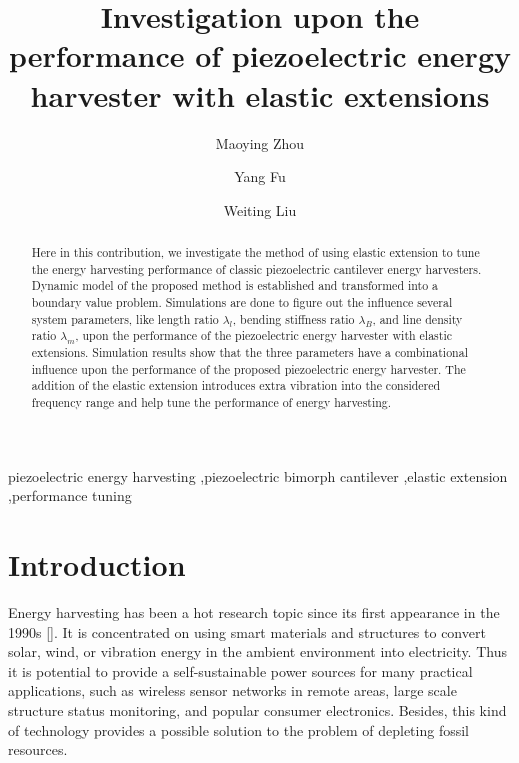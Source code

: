 \documentclass{elsarticle}
\begin{document}
\title{Investigation upon the performance of piezoelectric energy harvester with elastic extensions}
\author[1]{Maoying Zhou}
\author[2,3]{Yang Fu}
\author[3]{Weiting Liu}


\address[1]{School of Mechanical Engineering, Hangzhou Dianzi University, Hangzhou, China}
\address[2]{School of Automation and Mechanical Systems, Zhejiang University of Science and Technology, Hangzhou, China}
\address[3]{State Key Lab of Fluid Power and Mechanical Systems, Zhejiang University, Hangzhou, China}


\begin{abstract}

Here in this contribution, we investigate the method of using elastic extension to tune the energy harvesting performance of classic piezoelectric cantilever energy harvesters. Dynamic model of the proposed method is established and transformed into a boundary value problem. Simulations are done to figure out the influence several system parameters, like length ratio $\lambda_l$, bending stiffness ratio $\lambda_B$, and line density ratio $\lambda_m$, upon the performance of the piezoelectric energy harvester with elastic extensions. Simulation results show that the three parameters have a combinational influence upon the performance of the proposed piezoelectric energy harvester. The addition of the elastic extension introduces extra vibration into the considered frequency range and help tune the performance of energy harvesting. 

\end{abstract}

\begin{keyword}
piezoelectric energy harvesting \sep piezoelectric bimorph cantilever \sep elastic extension \sep performance tuning
\end{keyword}

\maketitle


\section{Introduction}

Energy harvesting has been a hot research topic since its first appearance in the 1990s []. It is concentrated on using smart materials and structures to convert solar, wind, or vibration energy in the ambient environment into electricity. Thus it is potential to provide a self-sustainable power sources for many practical applications, such as wireless sensor networks in remote areas, large scale structure status monitoring, and popular consumer electronics. Besides, this kind of technology provides a possible solution to the problem of depleting fossil resources. 
\end{document}
